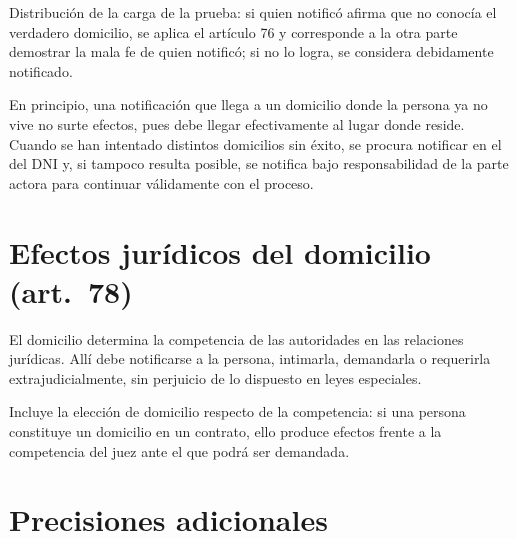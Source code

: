 \documentclass[12pt,oneside]{book}
\begin{document}
\begin{importante}
Distribución de la carga de la prueba: si quien notificó afirma que no conocía el verdadero domicilio, se aplica el artículo 76 y corresponde a la otra parte demostrar la mala fe de quien notificó; si no lo logra, se considera debidamente notificado.
\end{importante}

En principio, una notificación que llega a un domicilio donde la persona ya no vive no surte efectos, pues debe llegar efectivamente al lugar donde reside. Cuando se han intentado distintos domicilios sin éxito, se procura notificar en el del DNI y, si tampoco resulta posible, se notifica bajo responsabilidad de la parte actora para continuar válidamente con el proceso.

\section{Efectos jurídicos del domicilio (art.~78)}

\begin{regla}
El domicilio determina la competencia de las autoridades en las relaciones jurídicas. Allí debe notificarse a la persona, intimarla, demandarla o requerirla extrajudicialmente, sin perjuicio de lo dispuesto en leyes especiales.
\end{regla}

Incluye la elección de domicilio respecto de la competencia: si una persona constituye un domicilio en un contrato, ello produce efectos frente a la competencia del juez ante el que podrá ser demandada.

\section{Precisiones adicionales}
\end{document}
